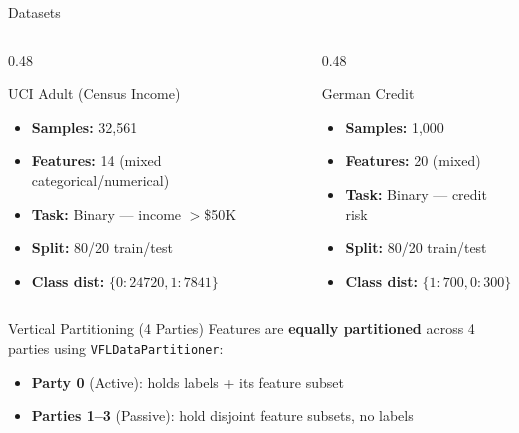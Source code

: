\documentclass[aspectratio=169, 11pt]{beamer}
\begin{document}
\begin{frame}{Datasets}
  \begin{columns}[T]
    \begin{column}{0.48\textwidth}
      \begin{block}{UCI Adult (Census Income)}
        \begin{itemize}
          \item \textbf{Samples:} 32,561
          \item \textbf{Features:} 14 (mixed categorical/numerical)
          \item \textbf{Task:} Binary --- income $>$\$50K
          \item \textbf{Split:} 80/20 train/test
          \item \textbf{Class dist:} $\{0: 24720, 1: 7841\}$
        \end{itemize}
      \end{block}
    \end{column}
    \begin{column}{0.48\textwidth}
      \begin{block}{German Credit}
        \begin{itemize}
          \item \textbf{Samples:} 1,000
          \item \textbf{Features:} 20 (mixed)
          \item \textbf{Task:} Binary --- credit risk
          \item \textbf{Split:} 80/20 train/test
          \item \textbf{Class dist:} $\{1: 700, 0: 300\}$
        \end{itemize}
      \end{block}
    \end{column}
  \end{columns}

  \vspace{0.4cm}
  \begin{block}{Vertical Partitioning (4 Parties)}
    Features are \textbf{equally partitioned} across 4 parties using \texttt{VFLDataPartitioner}:
    \begin{itemize}
      \item \textbf{Party 0} (Active): holds labels + its feature subset
      \item \textbf{Parties 1--3} (Passive): hold disjoint feature subsets, no labels
    \end{itemize}
  \end{block}
\end{frame}
\end{document}

